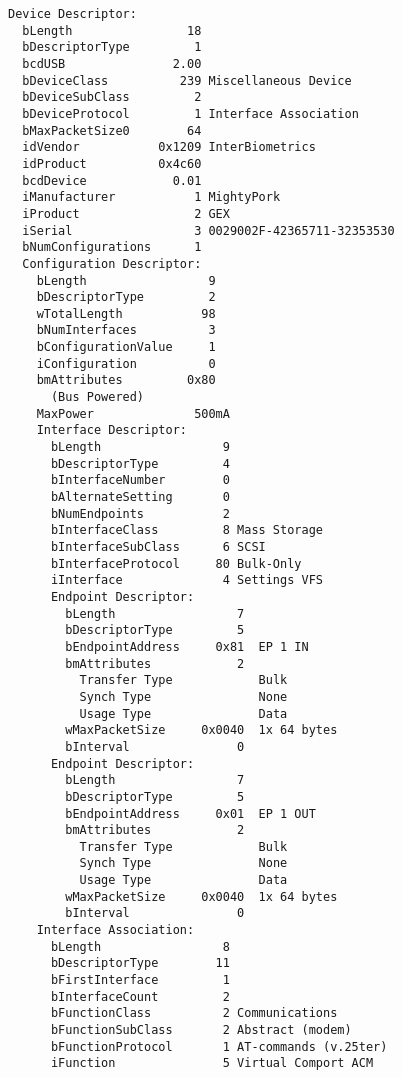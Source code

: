 \hspace*{-3em}
\begin{minipage}[t]{0.5\textwidth}\scriptsize
\begin{verbatim}
Device Descriptor:
  bLength                18
  bDescriptorType         1
  bcdUSB               2.00
  bDeviceClass          239 Miscellaneous Device
  bDeviceSubClass         2 
  bDeviceProtocol         1 Interface Association
  bMaxPacketSize0        64
  idVendor           0x1209 InterBiometrics
  idProduct          0x4c60 
  bcdDevice            0.01
  iManufacturer           1 MightyPork
  iProduct                2 GEX
  iSerial                 3 0029002F-42365711-32353530
  bNumConfigurations      1
  Configuration Descriptor:
    bLength                 9
    bDescriptorType         2
    wTotalLength           98
    bNumInterfaces          3
    bConfigurationValue     1
    iConfiguration          0 
    bmAttributes         0x80
      (Bus Powered)
    MaxPower              500mA
    Interface Descriptor:
      bLength                 9
      bDescriptorType         4
      bInterfaceNumber        0
      bAlternateSetting       0
      bNumEndpoints           2
      bInterfaceClass         8 Mass Storage
      bInterfaceSubClass      6 SCSI
      bInterfaceProtocol     80 Bulk-Only
      iInterface              4 Settings VFS
      Endpoint Descriptor:
        bLength                 7
        bDescriptorType         5
        bEndpointAddress     0x81  EP 1 IN
        bmAttributes            2
          Transfer Type            Bulk
          Synch Type               None
          Usage Type               Data
        wMaxPacketSize     0x0040  1x 64 bytes
        bInterval               0
      Endpoint Descriptor:
        bLength                 7
        bDescriptorType         5
        bEndpointAddress     0x01  EP 1 OUT
        bmAttributes            2
          Transfer Type            Bulk
          Synch Type               None
          Usage Type               Data
        wMaxPacketSize     0x0040  1x 64 bytes
        bInterval               0
    Interface Association:
      bLength                 8
      bDescriptorType        11
      bFirstInterface         1
      bInterfaceCount         2
      bFunctionClass          2 Communications
      bFunctionSubClass       2 Abstract (modem)
      bFunctionProtocol       1 AT-commands (v.25ter)
      iFunction               5 Virtual Comport ACM
\end{verbatim}
\end{minipage}\hspace{1em}
